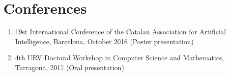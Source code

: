 \documentclass{article}
\begin{document}
\section*{Conferences}

	\begin{enumerate}
\item 19st International Conference of the Catalan Association for Artificial Intelligence, Barcelona, October 2016 (Poster presentation)
\item 4th URV Doctoral Workshop in Computer Science and Mathematics, Tarragona, 2017 (Oral presentation)
	\end{enumerate}
	
\end{document}
